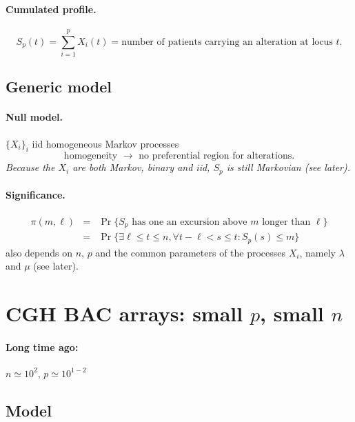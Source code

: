 \documentclass[a4paper,12pt]{article}
\begin{document}
\paragraph{Cumulated profile.}
$$
S_p(t) = \sum_{i=1}^p X_i(t) = \text{number of patients carrying an alteration at locus $t$}.
$$

\subsection{Generic model}
\paragraph{Null model.} $\{X_i\}_i$ iid homogeneous Markov processes
$$
\text{homogeneity } \rightarrow \text{ no preferential region for alterations}.
$$
{\sl Because the $X_i$ are both Markov, binary and iid, $S_p$ is still Markovian (see later).}

\paragraph{Significance.}
\begin{eqnarray*}
\pi(m, \ell) & = & \Pr\{\text{$S_p$ has one an excursion above $m$ longer than $\ell$}\} \\
& = & \Pr\{\exists \ell \leq t \leq n, \forall t-\ell < s \leq t: S_p(s) \leq m\}
\end{eqnarray*}
also depends on $n$, $p$ and the common parameters of the processes $X_i$, namely $\lambda$ and $\mu$ (see later).

\newpage
\section{CGH BAC arrays: small $p$, small $n$ \label{sec:np}}

\paragraph{Long time ago:} $n \simeq 10^2$, $p \simeq 10^{1-2}$ 

\subsection{Model}
\end{document}
